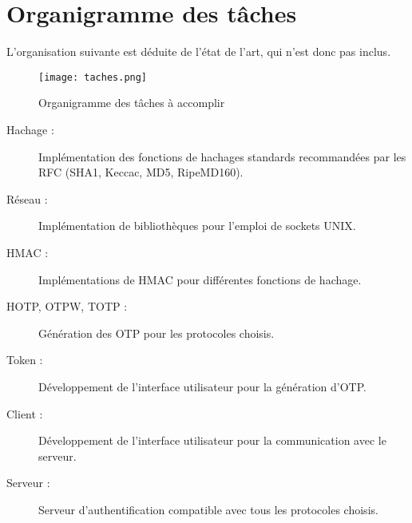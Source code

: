 \documentclass{../../res/univ-projet}
\begin{document}
\section{Organigramme des t\^aches}
L'organisation suivante est déduite de l'état de l'art, qui n'est donc pas inclus.
\begin{figure}[h]
\texttt{[image: taches.png]}
\caption{Organigramme des tâches à accomplir}
\end{figure}
\begin{description}
\item[Hachage :]Implémentation des fonctions de hachages standards recommandées par les RFC (SHA1, Keccac, MD5, RipeMD160).
\item[Réseau :]Implémentation de bibliothèques pour l'emploi de sockets UNIX.
\item[HMAC :]Implémentations de HMAC pour différentes fonctions de hachage.
\item[HOTP, OTPW, TOTP :]Génération des OTP pour les protocoles choisis.
\item[Token :]Développement de l'interface utilisateur pour la génération d'OTP.
\item[Client :]Développement de l'interface utilisateur pour la communication avec le serveur.
\item[Serveur :]Serveur d'authentification compatible avec tous les protocoles choisis.
\end{description}
\newpage
\end{document}
